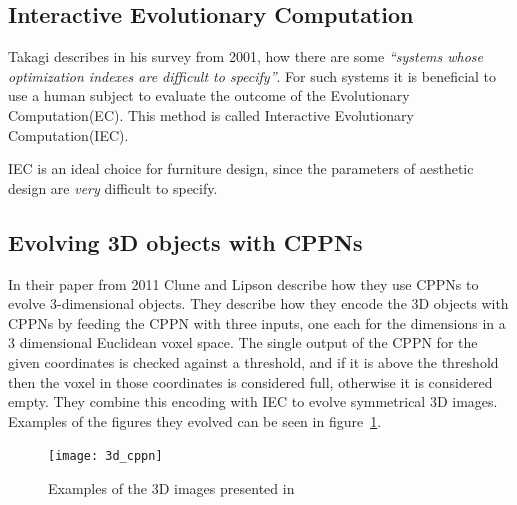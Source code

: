 \subsection{Interactive Evolutionary Computation}
Takagi describes in his survey from 2001\cite{Takagi2001}, how there are some 
\emph{``systems whose optimization indexes are difficult to 
specify''}\cite[p.~1275]{Takagi2001}.
For such systems it is beneficial to use a human subject to evaluate the outcome
of the Evolutionary Computation(EC). This method is called Interactive
Evolutionary Computation(IEC).

IEC is an ideal choice for furniture design, since the parameters of aesthetic
design are \emph{very} difficult to specify.

\subsection{Evolving 3D objects with CPPNs}
In their paper from 2011 Clune and Lipson describe how they use CPPNs to evolve 
3-dimensional objects\cite{Clune:2011:EOG:2078245.2078246}.
They describe how they encode the 3D objects with CPPNs by feeding the CPPN 
with three inputs, one each for the dimensions in a 3 dimensional Euclidean
voxel space.
The single output of the CPPN for the given coordinates is checked against a
threshold, and if it is above the threshold then the voxel in those coordinates
is considered full, otherwise it is considered
empty\cite[p.~5]{Clune:2011:EOG:2078245.2078246}. They combine this encoding
with IEC to evolve symmetrical 3D images. Examples of the figures they evolved
can be seen in figure~\ref{fig:3dobjects}.
\begin{figure}[ht]
\centering
\texttt{[image: 3d\_cppn]}
\caption{Examples of the 3D images presented in 
\cite{Clune:2011:EOG:2078245.2078246}}
\label{fig:3dobjects}
\end{figure}

